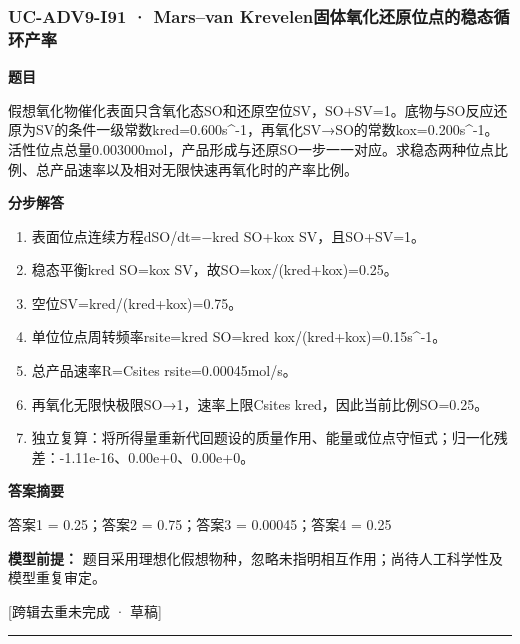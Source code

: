 \documentclass[UTF8,11pt,a4paper]{ctexart}
\begin{document}
\subsubsection*{UC-ADV9-I91 · Mars–van Krevelen固体氧化还原位点的稳态循环产率}
\noindent\textbf{题目}\par
假想氧化物催化表面只含氧化态SO和还原空位SV，SO+SV=1。底物与SO反应还原为SV的条件一级常数kred=0.600s\textasciicircum{}-1，再氧化SV→SO的常数kox=0.200s\textasciicircum{}-1。活性位点总量0.003000mol，产品形成与还原SO一步一一对应。求稳态两种位点比例、总产品速率以及相对无限快速再氧化时的产率比例。\par
\medskip\noindent\textbf{分步解答}
\begin{enumerate}
\item 表面位点连续方程dSO/dt=−kred SO+kox SV，且SO+SV=1。
\item 稳态平衡kred SO=kox SV，故SO=kox/(kred+kox)=0.25。
\item 空位SV=kred/(kred+kox)=0.75。
\item 单位位点周转频率rsite=kred SO=kred kox/(kred+kox)=0.15s\textasciicircum{}-1。
\item 总产品速率R=Csites rsite=0.00045mol/s。
\item 再氧化无限快极限SO→1，速率上限Csites kred，因此当前比例SO=0.25。
\item 独立复算：将所得量重新代回题设的质量作用、能量或位点守恒式；归一化残差：-1.11e-16、0.00e+0、0.00e+0。
\end{enumerate}
\noindent\textbf{答案摘要}\par
答案1 = 0.25；答案2 = 0.75；答案3 = 0.00045；答案4 = 0.25\par
\noindent\textbf{模型前提：}
题目采用理想化假想物种，忽略未指明相互作用；尚待人工科学性及模型重复审定。\par
\noindent\textcolor{red!65!black}{[跨辑去重未完成 · 草稿]} \par
\medskip\hrule\medskip
{}
\end{document}
